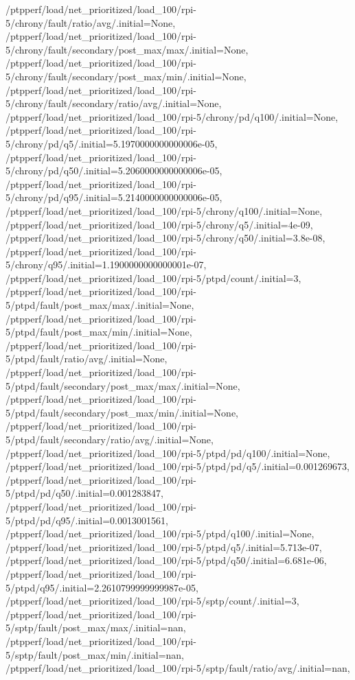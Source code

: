 {    /ptpperf/load/net_prioritized/load_100/rpi-5/chrony/fault/ratio/avg/.initial=None,
    /ptpperf/load/net_prioritized/load_100/rpi-5/chrony/fault/secondary/post_max/max/.initial=None,
    /ptpperf/load/net_prioritized/load_100/rpi-5/chrony/fault/secondary/post_max/min/.initial=None,
    /ptpperf/load/net_prioritized/load_100/rpi-5/chrony/fault/secondary/ratio/avg/.initial=None,
    /ptpperf/load/net_prioritized/load_100/rpi-5/chrony/pd/q100/.initial=None,
    /ptpperf/load/net_prioritized/load_100/rpi-5/chrony/pd/q5/.initial=5.1970000000000006e-05,
    /ptpperf/load/net_prioritized/load_100/rpi-5/chrony/pd/q50/.initial=5.2060000000000006e-05,
    /ptpperf/load/net_prioritized/load_100/rpi-5/chrony/pd/q95/.initial=5.2140000000000006e-05,
    /ptpperf/load/net_prioritized/load_100/rpi-5/chrony/q100/.initial=None,
    /ptpperf/load/net_prioritized/load_100/rpi-5/chrony/q5/.initial=4e-09,
    /ptpperf/load/net_prioritized/load_100/rpi-5/chrony/q50/.initial=3.8e-08,
    /ptpperf/load/net_prioritized/load_100/rpi-5/chrony/q95/.initial=1.1900000000000001e-07,
    /ptpperf/load/net_prioritized/load_100/rpi-5/ptpd/count/.initial=3,
    /ptpperf/load/net_prioritized/load_100/rpi-5/ptpd/fault/post_max/max/.initial=None,
    /ptpperf/load/net_prioritized/load_100/rpi-5/ptpd/fault/post_max/min/.initial=None,
    /ptpperf/load/net_prioritized/load_100/rpi-5/ptpd/fault/ratio/avg/.initial=None,
    /ptpperf/load/net_prioritized/load_100/rpi-5/ptpd/fault/secondary/post_max/max/.initial=None,
    /ptpperf/load/net_prioritized/load_100/rpi-5/ptpd/fault/secondary/post_max/min/.initial=None,
    /ptpperf/load/net_prioritized/load_100/rpi-5/ptpd/fault/secondary/ratio/avg/.initial=None,
    /ptpperf/load/net_prioritized/load_100/rpi-5/ptpd/pd/q100/.initial=None,
    /ptpperf/load/net_prioritized/load_100/rpi-5/ptpd/pd/q5/.initial=0.001269673,
    /ptpperf/load/net_prioritized/load_100/rpi-5/ptpd/pd/q50/.initial=0.001283847,
    /ptpperf/load/net_prioritized/load_100/rpi-5/ptpd/pd/q95/.initial=0.0013001561,
    /ptpperf/load/net_prioritized/load_100/rpi-5/ptpd/q100/.initial=None,
    /ptpperf/load/net_prioritized/load_100/rpi-5/ptpd/q5/.initial=5.713e-07,
    /ptpperf/load/net_prioritized/load_100/rpi-5/ptpd/q50/.initial=6.681e-06,
    /ptpperf/load/net_prioritized/load_100/rpi-5/ptpd/q95/.initial=2.2610799999999987e-05,
    /ptpperf/load/net_prioritized/load_100/rpi-5/sptp/count/.initial=3,
    /ptpperf/load/net_prioritized/load_100/rpi-5/sptp/fault/post_max/max/.initial=nan,
    /ptpperf/load/net_prioritized/load_100/rpi-5/sptp/fault/post_max/min/.initial=nan,
    /ptpperf/load/net_prioritized/load_100/rpi-5/sptp/fault/ratio/avg/.initial=nan,
}
